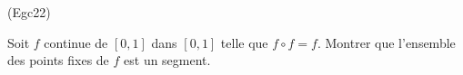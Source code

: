 \begin{tiny}(Egc22)\end{tiny} Soit $f$ continue de $\left[ 0,1\right]$ dans $\left[ 0,1\right]$ telle que $f\circ f = f$. Montrer que l'ensemble des points fixes de $f$ est un segment.  